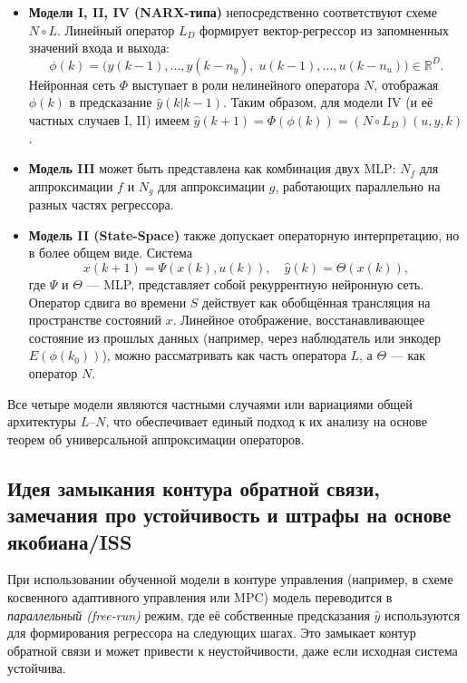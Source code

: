 \documentclass[../NDCNNAI_main.tex]{subfiles}
\begin{document}
\begin{itemize}
    \item \textbf{Модели I, II, IV (NARX-типа)} непосредственно соответствуют схеме \(N \circ L\). Линейный оператор \(L_D\) формирует вектор-регрессор из запомненных значений входа и выхода:
    \[
    \phi(k) = \big( y(k-1), \dots, y(k-n_y),\; u(k-1), \dots, u(k-n_u) \big) \in \mathbb{R}^{D}.
    \]
    Нейронная сеть \(\Phi\) выступает в роли нелинейного оператора \(N\), отображая \(\phi(k)\) в предсказание \(\hat{y}(k|k-1)\). Таким образом, для модели IV (и её частных случаев I, II) имеем \(\hat{y}(k+1) = \Phi(\phi(k)) = (N \circ L_D)(u, y, k)\).

    \item \textbf{Модель III} может быть представлена как комбинация двух MLP: \(N_f\) для аппроксимации \(f\) и \(N_g\) для аппроксимации \(g\), работающих параллельно на разных частях регрессора.
    
    \item \textbf{Модель II (State-Space)} также допускает операторную интерпретацию, но в более общем виде. Система
    \[
    x(k+1) = \Psi(x(k), u(k)), \quad \hat{y}(k) = \Theta(x(k)),
    \]
    где \(\Psi\) и \(\Theta\) --- MLP, представляет собой рекуррентную нейронную сеть. Оператор сдвига во времени \(S\) действует как обобщённая трансляция на пространстве состояний \(x\). Линейное отображение, восстанавливающее состояние из прошлых данных (например, через наблюдатель или энкодер \(E(\phi(k_0))\)), можно рассматривать как часть оператора \(L\), а \(\Theta\) --- как оператор \(N\).
\end{itemize}

Все четыре модели являются частными случаями или вариациями общей архитектуры $L$--$N$, что обеспечивает единый подход к их анализу на основе теорем об универсальной аппроксимации операторов.

\subsection{Идея замыкания контура обратной связи, замечания про устойчивость и штрафы на основе якобиана/ISS}

При использовании обученной модели в контуре управления (например, в схеме косвенного адаптивного управления или MPC) модель переводится в \emph{параллельный (free-run)} режим, где её собственные предсказания \(\hat{y}\) используются для формирования регрессора на следующих шагах. Это замыкает контур обратной связи и может привести к неустойчивости, даже если исходная система устойчива.
\end{document}
